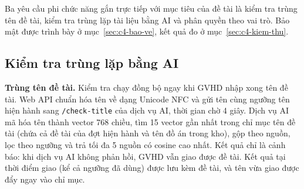 \documentclass[../main.tex]{subfiles}
\begin{document}
Ba yêu cầu phi chức năng gắn trực tiếp với mục tiêu của đề tài là kiểm tra trùng tên đề tài, kiểm tra trùng lặp tài liệu bằng AI và phân quyền theo vai trò. Bảo mật được trình bày ở mục~\ref{sec:c4-bao-ve}, kết quả đo ở mục~\ref{sec:c4-kiem-thu}.

\subsection{Kiểm tra trùng lặp bằng AI}\label{sec:c4-ai-trung-lap}

\textbf{Trùng tên đề tài.} Kiểm tra chạy đồng bộ ngay khi GVHD nhập xong tên đề tài. Web API chuẩn hóa tên về dạng Unicode NFC và gửi tên cùng ngưỡng tên hiện hành sang \texttt{/check-title} của dịch vụ AI, thời gian chờ 4 giây. Dịch vụ AI mã hóa tên thành vector 768 chiều, tìm 15 vector gần nhất trong chỉ mục tên đề tài (chứa cả đề tài của đợt hiện hành và tên đồ án trong kho), gộp theo nguồn, lọc theo ngưỡng và trả tối đa 5 nguồn có cosine cao nhất. Kết quả chỉ là cảnh báo: khi dịch vụ AI không phản hồi, GVHD vẫn giao được đề tài. Kết quả tại thời điểm giao (kể cả ngưỡng đã dùng) được lưu kèm đề tài, và tên vừa giao được đẩy ngay vào chỉ mục.
\end{document}
